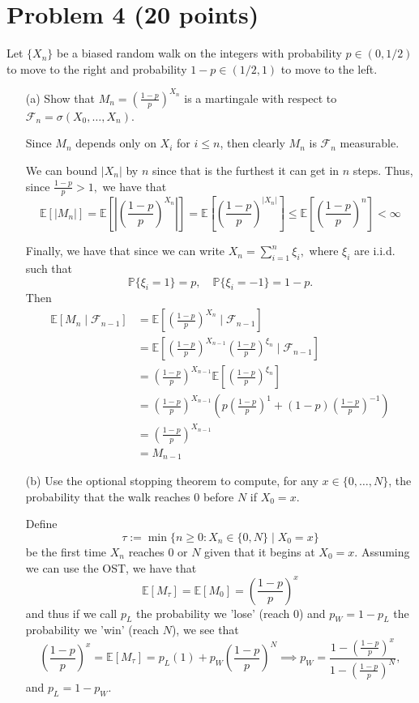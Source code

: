 \documentclass[11pt]{article}
\newcommand{\bbE}{\mathbb{E}}
\newcommand{\bbP}{\mathbb{P}}
\begin{document}
\newpage

\section*{Problem 4 (20 points)}
Let \(\{X_n\}\) be a biased random walk on the integers with probability \(p \in (0, 1/2)\) to move to the right and probability \(1 - p \in (1/2, 1)\) to move to the left.

\begin{itemize}
    \item[(a)] Show that \(M_n = \left(\frac{1 - p}{p}\right)^{X_n}\) is a martingale with respect to \(\mathcal{F}_n = \sigma(X_0, \ldots, X_n)\).
\begin{solution}
    Since $M_n$ depends only on $X_i$ for $i \leq n$, then clearly $M_n$ is $\mathcal{F}_n$ measurable.

    We can bound $|X_n|$ by $n$ since that is the furthest it can get in $n$ steps. Thus, since $\frac{1-p}{p} >1,$ we have that 
    \[\bbE[|M_n|]  = \bbE\left[\left|\left(\frac{1 - p}{p}\right)^{X_n}\right|\right] = \bbE\left[\left(\frac{1 - p}{p}\right)^{|X_n|}\right] \leq \bbE\left[\left(\frac{1 - p}{p}\right)^{n}\right] < \infty\]

    Finally, we have that since we can write $X_n = \sum_{i=1}^n \xi_i,$ where $\xi_i$ are i.i.d. such that
    \[\bbP\{\xi_i = 1\} = p, \quad \bbP\{\xi_i = -1\} = 1-p.\] Then
    \begin{align*}
        \bbE[M_n \mid \mathcal{F}_{n-1}] &= \bbE\left[\left(\frac{1-p}{p}\right)^{X_n} \mid \mathcal{F}_{n-1}\right]\\
        &= \bbE\left[\left(\frac{1-p}{p}\right)^{X_{n-1}}\left(\frac{1-p}{p}\right)^{\xi_{n}} \mid \mathcal{F}_{n-1}\right]\\
        &= \left(\frac{1-p}{p}\right)^{X_{n-1}}\bbE\left[\left(\frac{1-p}{p}\right)^{\xi_{n}}\right]\\
        &=\left(\frac{1-p}{p}\right)^{X_{n-1}} (p\left(\frac{1-p}{p}\right)^{1} + (1-p)\left(\frac{1-p}{p}\right)^{-1}) \\
        &= \left(\frac{1-p}{p}\right)^{X_{n-1}}\\
        &= M_{n-1}
    \end{align*}
\end{solution}
    \item[(b)] Use the optional stopping theorem to compute, for any \(x \in \{0, \ldots, N\}\), the probability that the walk reaches 0 before \(N\) if \(X_0 = x\).
    \begin{solution}
        Define
        \[\tau:= \min\{ n \geq 0 : X_n \in \{0, N\} \mid X_0 = x\}\] be the first time $X_n$ reaches $0$ or $N$ given that it begins at $X_0 = x.$ Assuming we can use the OST, we have that 
        \[\bbE[M_\tau] = \bbE[M_0] = \left(\frac{1-p}{p}\right)^x\] and thus if we call $p_L$ the probability we 'lose' (reach $0$) and $p_W = 1-p_L$ the probability we 'win' (reach $N$), we see that
        \[\left(\frac{1-p}{p}\right)^x = \bbE[M_\tau] = p_L (1) + p_W\left(\frac{1-p}{p}\right)^N \implies p_W = \frac{1 - \left(\frac{1-p}{p}\right)^x}{1 - \left(\frac{1-p}{p}\right)^N},\] and $p_L = 1-p_W.$ 


\end{solution}
\end{itemize}
\end{document}
